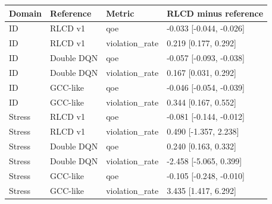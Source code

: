 \begin{tabular}{llll}
\toprule
Domain & Reference & Metric & RLCD minus reference \\
\midrule
ID & RLCD v1 & qoe & -0.033 [-0.044, -0.026] \\
ID & RLCD v1 & violation\_rate & 0.219 [0.177, 0.292] \\
ID & Double DQN & qoe & -0.057 [-0.093, -0.038] \\
ID & Double DQN & violation\_rate & 0.167 [0.031, 0.292] \\
ID & GCC-like & qoe & -0.046 [-0.054, -0.039] \\
ID & GCC-like & violation\_rate & 0.344 [0.167, 0.552] \\
Stress & RLCD v1 & qoe & -0.081 [-0.144, -0.012] \\
Stress & RLCD v1 & violation\_rate & 0.490 [-1.357, 2.238] \\
Stress & Double DQN & qoe & 0.240 [0.163, 0.332] \\
Stress & Double DQN & violation\_rate & -2.458 [-5.065, 0.399] \\
Stress & GCC-like & qoe & -0.105 [-0.248, -0.010] \\
Stress & GCC-like & violation\_rate & 3.435 [1.417, 6.292] \\
\bottomrule
\end{tabular}
